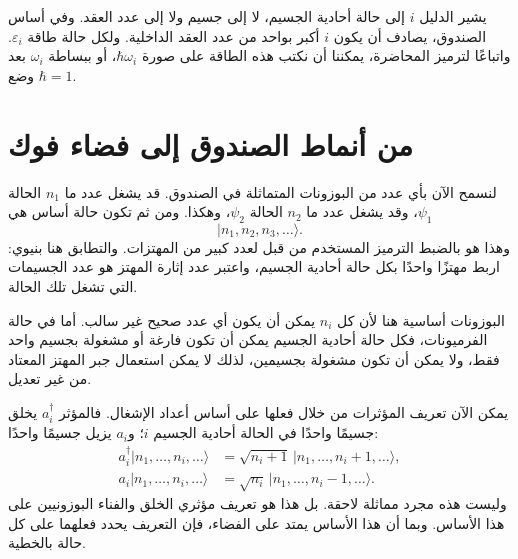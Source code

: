 يشير الدليل \(i\) إلى حالة أحادية الجسيم، لا إلى جسيم ولا إلى عدد العقد. وفي أساس الصندوق، يصادف أن يكون \(i\) أكبر بواحد من عدد العقد الداخلية. ولكل حالة طاقة \(\varepsilon_i\). واتباعًا لترميز المحاضرة، يمكننا أن نكتب هذه الطاقة على صورة \(\hbar\omega_i\)، أو ببساطة \(\omega_i\) بعد وضع \(\hbar=1\).

\begin{classroomqa}
\end{classroomqa}

\begin{classroomqa}
\end{classroomqa}

\section{من أنماط الصندوق إلى فضاء فوك}

لنسمح الآن بأي عدد من البوزونات المتماثلة في الصندوق. قد يشغل عدد ما \(n_1\) الحالة \(\psi_1\)، وقد يشغل عدد ما \(n_2\) الحالة \(\psi_2\)، وهكذا. ومن ثم تكون حالة أساس هي
\begin{equation}
|n_1,n_2,n_3,\ldots\rangle.
\end{equation}
وهذا هو بالضبط الترميز المستخدم من قبل لعدد كبير من المهتزات. والتطابق هنا بنيوي: اربط مهتزًا واحدًا بكل حالة أحادية الجسيم، واعتبر عدد إثارة المهتز هو عدد الجسيمات التي تشغل تلك الحالة.

البوزونات أساسية هنا لأن كل \(n_i\) يمكن أن يكون أي عدد صحيح غير سالب. أما في حالة الفرميونات، فكل حالة أحادية الجسيم يمكن أن تكون فارغة أو مشغولة بجسيم واحد فقط، ولا يمكن أن تكون مشغولة بجسيمين، لذلك لا يمكن استعمال جبر المهتز المعتاد من غير تعديل.

يمكن الآن تعريف المؤثرات من خلال فعلها على أساس أعداد الإشغال. فالمؤثر \(a_i^\dagger\) يخلق جسيمًا واحدًا في الحالة أحادية الجسيم \(i\)؛ و\(a_i\) يزيل جسيمًا واحدًا:
\begin{align}
a_i^\dagger|n_1,\ldots,n_i,\ldots\rangle
&=\sqrt{n_i+1}\,|n_1,\ldots,n_i+1,\ldots\rangle, \\
a_i|n_1,\ldots,n_i,\ldots\rangle
&=\sqrt{n_i}\,|n_1,\ldots,n_i-1,\ldots\rangle.
\end{align}
وليست هذه مجرد مماثلة لاحقة. بل هذا هو تعريف مؤثري الخلق والفناء البوزونيين على هذا الأساس. وبما أن هذا الأساس يمتد على الفضاء، فإن التعريف يحدد فعلهما على كل حالة بالخطية.

